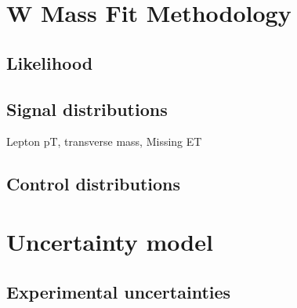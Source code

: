 \documentclass[NOTE, REPORT=true, atlasdraft=true, british, subfigure]{atlasdoc}
\begin{document}
\maketitle

\tableofcontents
















\chapter{W Mass Fit Methodology}
\label{sec:fit}

\section{Likelihood}

\section{Signal distributions}

Lepton pT, transverse mass, Missing ET

\section{Control distributions}


\chapter{Uncertainty model}
\label{sec:sys}

\section{Experimental uncertainties}
\end{document}

